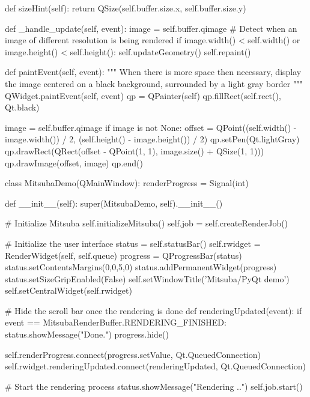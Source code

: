 \begin{python}
    def sizeHint(self):
        return QSize(self.buffer.size.x, self.buffer.size.y)

    def _handle_update(self, event):
        image = self.buffer.qimage
        # Detect when an image of different resolution is being rendered
        if image.width() < self.width() or image.height() < self.height():
            self.updateGeometry()
        self.repaint()

    def paintEvent(self, event):
        """ When there is more space then necessary, display the image centered
            on a black background, surrounded by a light gray border """
        QWidget.paintEvent(self, event)
        qp = QPainter(self)
        qp.fillRect(self.rect(), Qt.black)

        image = self.buffer.qimage
        if image is not None:
            offset = QPoint((self.width() - image.width()) / 2,
                (self.height() - image.height()) / 2)
            qp.setPen(Qt.lightGray)
            qp.drawRect(QRect(offset - QPoint(1, 1), image.size() + QSize(1, 1)))
            qp.drawImage(offset, image)
        qp.end()

class MitsubaDemo(QMainWindow):
    renderProgress = Signal(int)

    def __init__(self):
        super(MitsubaDemo, self).__init__()

        # Initialize Mitsuba
        self.initializeMitsuba()
        self.job = self.createRenderJob()

        # Initialize the user interface
        status = self.statusBar()
        self.rwidget = RenderWidget(self, self.queue)
        progress = QProgressBar(status)
        status.setContentsMargins(0,0,5,0)
        status.addPermanentWidget(progress)
        status.setSizeGripEnabled(False)
        self.setWindowTitle('Mitsuba/PyQt demo')
        self.setCentralWidget(self.rwidget)

        # Hide the scroll bar once the rendering is done
        def renderingUpdated(event):
            if event == MitsubaRenderBuffer.RENDERING_FINISHED:
                status.showMessage("Done.")
                progress.hide()

        self.renderProgress.connect(progress.setValue, Qt.QueuedConnection)
        self.rwidget.renderingUpdated.connect(renderingUpdated,
            Qt.QueuedConnection)

        # Start the rendering process
        status.showMessage("Rendering ..")
        self.job.start()


\end{python}
